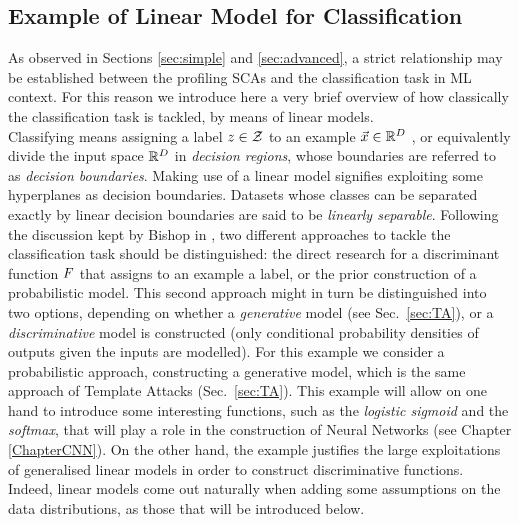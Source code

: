 \subsection{Example of Linear Model for Classification}\label{example:LDA}
As observed in Sections \ref{sec:simple} and \ref{sec:advanced}, a strict relationship may be established between the profiling SCAs and the classification task in ML context. For this reason we introduce here a very brief overview of how classically the classification task is tackled, by means of linear models. \\
Classifying means assigning a label $z\in \mathcal{Z}$ to an example $\vec{x}\in\mathbb{R}^D$ , or equivalently divide the input space $\mathbb{R}^D$ in \emph{decision regions}, whose boundaries are referred to as \emph{decision boundaries}. Making use of a linear model signifies exploiting some hyperplanes as decision boundaries. Datasets whose classes can be separated exactly by linear decision boundaries are said to be \emph{linearly separable}. Following the discussion kept by Bishop in \cite{christopher2006pattern}, two different approaches to tackle the classification task should be distinguished: the direct research for a discriminant function $F$ that assigns to an example a label, or the prior construction of a probabilistic model. This second approach might in turn be distinguished into two options, depending on whether a \emph{generative} model  (see Sec.~\ref{sec:TA}), or a \emph{discriminative} model is constructed (\ie only conditional probability densities of outputs given the inputs are modelled). For this example we consider a probabilistic approach, constructing a generative model, which is the same approach of Template Attacks (Sec.~\ref{sec:TA}). This example will allow on one hand to introduce some interesting functions, such as the \emph{logistic sigmoid} and the \emph{softmax}, that will play a role in the construction of Neural Networks (see Chapter \ref{ChapterCNN}). On the other hand, the example justifies the large exploitations of generalised linear models in order to construct discriminative functions. Indeed, linear models come out naturally when adding some assumptions on the data distributions, as those that will be introduced below. \\

